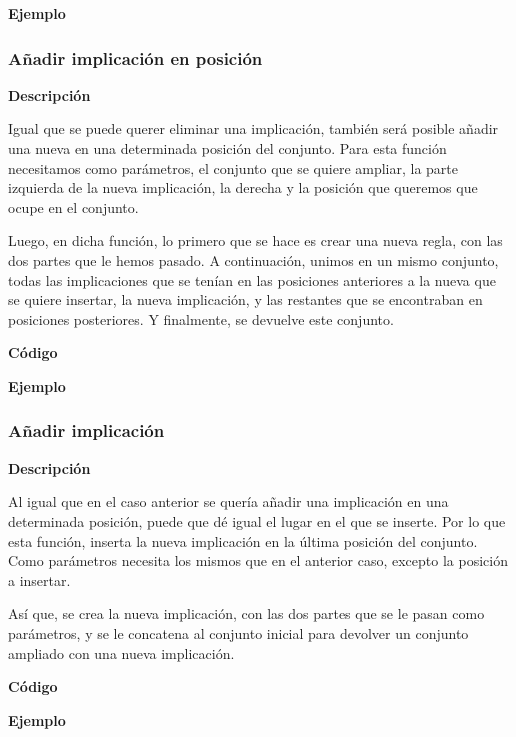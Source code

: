     \textbf{Ejemplo}



\subsubsection{A\~nadir implicaci\'on en posici\'on}

    \textbf{Descripci\'on}

    Igual que se puede querer eliminar una implicaci\'on, tambi\'en ser\'a posible a\~nadir una nueva en una determinada posici\'on 
    del conjunto. Para esta funci\'on necesitamos como par\'ametros, el conjunto que se quiere ampliar, la parte izquierda de la nueva 
    implicaci\'on, la derecha y la posici\'on que queremos que ocupe en el conjunto.

    Luego, en dicha funci\'on, lo primero que se hace es crear una nueva regla, con las dos partes que le hemos pasado. A continuaci\'on, 
    unimos en un mismo conjunto, todas las implicaciones que se ten\'ian en las posiciones anteriores a la nueva que se quiere insertar, 
    la nueva implicaci\'on, y las restantes que se encontraban en posiciones posteriores. Y finalmente, se devuelve este conjunto.


    \textbf{C\'odigo}


    \textbf{Ejemplo}



\subsubsection{A\~nadir implicaci\'on}

    \textbf{Descripci\'on}

    Al igual que en el caso anterior se quer\'ia a\~nadir una implicaci\'on en una determinada posici\'on, puede que d\'e igual 
    el lugar en el que se inserte. Por lo que esta funci\'on, inserta la nueva implicaci\'on en la \'ultima posici\'on del 
    conjunto. Como par\'ametros necesita los mismos que en el anterior caso, excepto la posici\'on a insertar.

    As\'i que, se crea la nueva implicaci\'on, con las dos partes que se le pasan como par\'ametros, y se le concatena al conjunto 
    inicial para devolver un conjunto ampliado con una nueva implicaci\'on.

    \textbf{C\'odigo}


    \textbf{Ejemplo}



